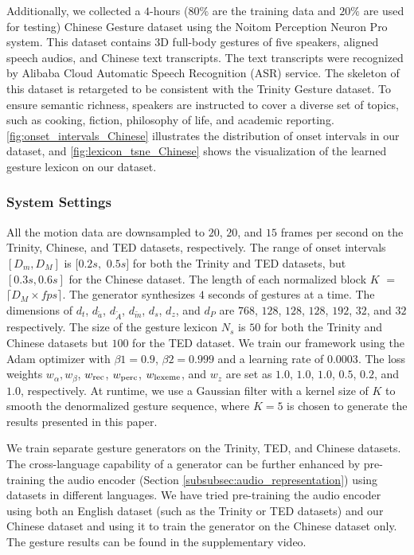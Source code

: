Additionally, we collected a $4$-hours ($80\%$ are the training data and $20\%$ are used for testing) Chinese Gesture dataset using the Noitom Perception Neuron Pro system. This dataset contains 3D full-body gestures of five speakers, aligned speech audios, and Chinese text transcripts. The text transcripts were recognized by Alibaba Cloud Automatic Speech Recognition (ASR) service. The skeleton of this dataset is retargeted to be consistent with the Trinity Gesture dataset. To ensure semantic richness, speakers are instructed to cover a diverse set of topics, such as cooking, fiction, philosophy of life, and academic reporting. \fig\ref{fig:onset_intervals_Chinese} illustrates the distribution of onset intervals in our dataset, and \fig\ref{fig:lexicon_tsne_Chinese} shows the visualization of the learned gesture lexicon on our dataset.

\subsubsection{System Settings}
All the motion data are downsampled to $20$, $20$, and $15$ frames per second on the Trinity, Chinese, and TED datasets, respectively. The range of onset intervals $[D_m, D_M]$ is $[0.2s,$ $0.5s]$ for both the Trinity and TED datasets, but $[0.3s, 0.6s]$ for the Chinese dataset. The length of each normalized block $K$ $=$ $\lceil D_M\times{}fps \rceil$. The generator synthesizes $4$ seconds of gestures at a time. The dimensions of $d_t$, $d_{\tilde{a}}$, $d_{\tilde{A}}$, $d_{\tilde{m}}$, $d_s$, $d_z$, and $d_{P}$ are $768$, $128$, $128$, $128$, $192$, $32$, and $32$ respectively. The size of the gesture lexicon $N_s$ is $50$ for both the Trinity and Chinese datasets but $100$ for the TED dataset. We train our framework using the Adam optimizer with $\beta1 = 0.9$, $\beta2 = 0.999$ and a learning rate of $0.0003$. The loss weights $w_{\alpha}, w_{\beta}$, $w_{{\text{rec}}}$, $w_{{\text{perc}}}$, $w_{{\text{lexeme}}}$, and $w_{{z}}$ are set as $1.0$, $1.0$, $1.0$, $0.5$, $0.2$, and $1.0$, respectively. At runtime, we use a Gaussian filter with a kernel size of $K$ to smooth the denormalized gesture sequence, where $K=5$ is chosen to generate the results presented in this paper.

We train separate gesture generators on the Trinity, TED, and Chinese datasets. The cross-language capability of a generator can be further enhanced by pre-training the audio encoder (Section \ref{subsubsec:audio_representation}) using datasets in different languages. We have tried pre-training the audio encoder using both an English dataset (such as the Trinity or TED datasets) and our Chinese dataset and using it to train the generator on the Chinese dataset only. The gesture results can be found in the supplementary video.

